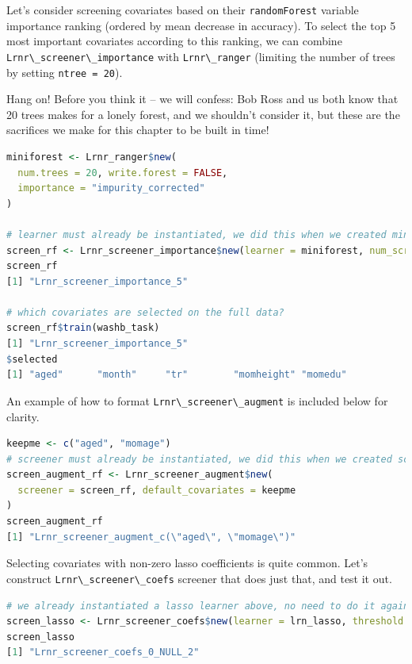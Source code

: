 \documentclass[
  12pt, krantz2,
]{krantz}
\newcommand{\passthrough}[1]{#1}
\newcommand{\1}{\mathbbm{1}}
\theoremstyle{definition}
\theoremstyle{definition}
\theoremstyle{definition}
\theoremstyle{definition}
\theoremstyle{remark}
\begin{document}
Let's consider screening covariates based on their \passthrough{\lstinline!randomForest!} variable
importance ranking (ordered by mean decrease in accuracy). To select the top
5 most important covariates according to this ranking, we can combine
\passthrough{\lstinline!Lrnr\_screener\_importance!} with \passthrough{\lstinline!Lrnr\_ranger!} (limiting the number of trees by
setting \passthrough{\lstinline!ntree = 20!}).

Hang on! Before you think it -- we will confess: Bob Ross and us both know that
20 trees makes for a lonely forest, and we shouldn't consider it, but these are
the sacrifices we make for this chapter to be built in time!

\begin{lstlisting}[language=R]
miniforest <- Lrnr_ranger$new(
  num.trees = 20, write.forest = FALSE,
  importance = "impurity_corrected"
)

# learner must already be instantiated, we did this when we created miniforest
screen_rf <- Lrnr_screener_importance$new(learner = miniforest, num_screen = 5)
screen_rf
[1] "Lrnr_screener_importance_5"

# which covariates are selected on the full data?
screen_rf$train(washb_task)
[1] "Lrnr_screener_importance_5"
$selected
[1] "aged"      "month"     "tr"        "momheight" "momedu"   
\end{lstlisting}

An example of how to format \passthrough{\lstinline!Lrnr\_screener\_augment!} is included below for
clarity.

\begin{lstlisting}[language=R]
keepme <- c("aged", "momage")
# screener must already be instantiated, we did this when we created screen_rf
screen_augment_rf <- Lrnr_screener_augment$new(
  screener = screen_rf, default_covariates = keepme
)
screen_augment_rf
[1] "Lrnr_screener_augment_c(\"aged\", \"momage\")"
\end{lstlisting}

Selecting covariates with non-zero lasso coefficients is quite common. Let's
construct \passthrough{\lstinline!Lrnr\_screener\_coefs!} screener that does just that, and test it
out.

\begin{lstlisting}[language=R]
# we already instantiated a lasso learner above, no need to do it again
screen_lasso <- Lrnr_screener_coefs$new(learner = lrn_lasso, threshold = 0)
screen_lasso
[1] "Lrnr_screener_coefs_0_NULL_2"
\end{lstlisting}
\end{document}
